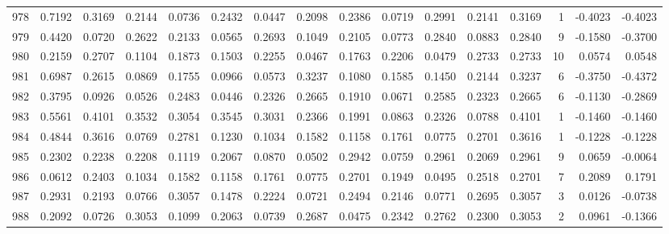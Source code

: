 \begin{tabular}{lrrrrrrrrrrrrrrr}
978 &      0.7192 &  0.3169 &  0.2144 &  0.0736 &  0.2432 &  0.0447 &  0.2098 &  0.2386 &  0.0719 &  0.2991 &   0.2141 &     0.3169 &      1 &                   -0.4023 &                    -0.4023 \\
979 &      0.4420 &  0.0720 &  0.2622 &  0.2133 &  0.0565 &  0.2693 &  0.1049 &  0.2105 &  0.0773 &  0.2840 &   0.0883 &     0.2840 &      9 &                   -0.1580 &                    -0.3700 \\
980 &      0.2159 &  0.2707 &  0.1104 &  0.1873 &  0.1503 &  0.2255 &  0.0467 &  0.1763 &  0.2206 &  0.0479 &   0.2733 &     0.2733 &     10 &                    0.0574 &                     0.0548 \\
981 &      0.6987 &  0.2615 &  0.0869 &  0.1755 &  0.0966 &  0.0573 &  0.3237 &  0.1080 &  0.1585 &  0.1450 &   0.2144 &     0.3237 &      6 &                   -0.3750 &                    -0.4372 \\
982 &      0.3795 &  0.0926 &  0.0526 &  0.2483 &  0.0446 &  0.2326 &  0.2665 &  0.1910 &  0.0671 &  0.2585 &   0.2323 &     0.2665 &      6 &                   -0.1130 &                    -0.2869 \\
983 &      0.5561 &  0.4101 &  0.3532 &  0.3054 &  0.3545 &  0.3031 &  0.2366 &  0.1991 &  0.0863 &  0.2326 &   0.0788 &     0.4101 &      1 &                   -0.1460 &                    -0.1460 \\
984 &      0.4844 &  0.3616 &  0.0769 &  0.2781 &  0.1230 &  0.1034 &  0.1582 &  0.1158 &  0.1761 &  0.0775 &   0.2701 &     0.3616 &      1 &                   -0.1228 &                    -0.1228 \\
985 &      0.2302 &  0.2238 &  0.2208 &  0.1119 &  0.2067 &  0.0870 &  0.0502 &  0.2942 &  0.0759 &  0.2961 &   0.2069 &     0.2961 &      9 &                    0.0659 &                    -0.0064 \\
986 &      0.0612 &  0.2403 &  0.1034 &  0.1582 &  0.1158 &  0.1761 &  0.0775 &  0.2701 &  0.1949 &  0.0495 &   0.2518 &     0.2701 &      7 &                    0.2089 &                     0.1791 \\
987 &      0.2931 &  0.2193 &  0.0766 &  0.3057 &  0.1478 &  0.2224 &  0.0721 &  0.2494 &  0.2146 &  0.0771 &   0.2695 &     0.3057 &      3 &                    0.0126 &                    -0.0738 \\
988 &      0.2092 &  0.0726 &  0.3053 &  0.1099 &  0.2063 &  0.0739 &  0.2687 &  0.0475 &  0.2342 &  0.2762 &   0.2300 &     0.3053 &      2 &                    0.0961 &                    -0.1366 \\

\end{tabular}
